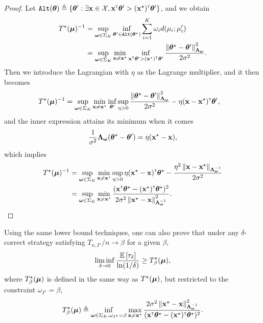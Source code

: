 \begin{proof}
Let $\texttt{Alt}({\boldsymbol \theta}) \triangleq \{{\boldsymbol \theta}':\exists {\bf x}\in\mathcal{X}, {\bf x}^\mathsf{\scriptscriptstyle T}{\boldsymbol \theta}'>({\bf x}^\star)^\mathsf{\scriptscriptstyle T}{\boldsymbol \theta}'\}$, and we obtain
\begin{align*}
    T^\star({\boldsymbol \mu})^{-1} &= \sup_{{\boldsymbol \omega}\in\Sigma_K}\inf_{{\boldsymbol \theta}'\in\texttt{Alt}({\boldsymbol \theta}^\star)}\sum_{i=1}^K \omega_i d(\mu_i;\mu_i')\\
                       &= \sup_{{\boldsymbol \omega}\in\Sigma_K}\min_{{\bf x}\neq{\bf x}^\star}\inf_{{\bf x}^\mathsf{\scriptscriptstyle T}{\boldsymbol \theta}'>({\bf x}^\star)^\mathsf{\scriptscriptstyle T}{\boldsymbol \theta}'} \frac{\left\lVert{\boldsymbol \theta}^\star-{\boldsymbol \theta}'\right\rVert_{{\boldsymbol \Lambda}_{{\boldsymbol \omega}}}^2}{2\sigma^2}.
\end{align*}
Then we introduce the Lagrangian with $\eta$ as the Lagrange multiplier, and it then becomes
\begin{align*}
    T^\star({\boldsymbol \mu})^{-1} &= \sup_{{\boldsymbol \omega}\in\Sigma_K}\min_{{\bf x}\neq{\bf x}^\star}\inf_{{\boldsymbol \theta}'}\sup_{\eta>0} \frac{\left\lVert{\boldsymbol \theta}^\star-{\boldsymbol \theta}'\right\rVert_{{\boldsymbol \Lambda}_{{\boldsymbol \omega}}}^2}{2\sigma^2} - \eta({\bf x}-{\bf x}^\star)^\mathsf{\scriptscriptstyle T}{\boldsymbol \theta}',
\end{align*}
and the inner expression attains its minimum when it comes
\[
    \frac{1}{\sigma^2}{\boldsymbol \Lambda}_{{\boldsymbol \omega}}({\boldsymbol \theta}^\star-{\boldsymbol \theta}') = \eta({\bf x}^\star-{\bf x}),
\]
which implies
\begin{align*}
    T^\star({\boldsymbol \mu})^{-1} &=
    \sup_{{\boldsymbol \omega}\in\Sigma_K}\min_{{\bf x}\neq{\bf x}^\star}\sup_{\eta>0} \eta({\bf x}^\star-{\bf x})^\mathsf{\scriptscriptstyle T}{\boldsymbol \theta}^\star - \frac{\eta^2\left\lVert{\bf x}-{\bf x}^\star\right\rVert_{{\boldsymbol \Lambda}_{{\boldsymbol \omega}}^{-1}}}{2\sigma^2}\\
    &= \sup_{{\boldsymbol \omega}\in\Sigma_K}\min_{{\bf x}\neq{\bf x}^\star}\frac{({\bf x}^\mathsf{\scriptscriptstyle T}{\boldsymbol \theta}^\star-({\bf x}^\star)^\mathsf{\scriptscriptstyle T}{\boldsymbol \theta}^\star)^2}{2\sigma^2\left\lVert{\bf x}^\star - {\bf x}\right\rVert^2_{{\boldsymbol \Lambda}_{{\boldsymbol \omega}}^{-1}}}.
\end{align*}
\end{proof}

Using the same lower bound techniques, one can also prove that under any $\delta$-correct strategy satisfying $T_{n,I^\star}/n \rightarrow \beta$ for a given $\beta$,
\[
    \liminf_{\delta \rightarrow 0}\frac{\mathbb{E}\left[\tau_\delta\right]}{\ln(1/\delta)} \geq T^\star_\beta({\boldsymbol \mu}),
\]
where $T^\star_\beta({\boldsymbol \mu})$ is defined in the same way as $T^\star({\boldsymbol \mu})$, but restricted to the constraint $\omega_{I^\star}=\beta$,
\[
    T^\star_{\beta}({\boldsymbol \mu}) \triangleq \inf_{{\boldsymbol \omega}\in\Sigma_K,\omega_{I^\star}=\beta}\max_{{\bf x}\neq {\bf x}^\star} \frac{2\sigma^2\left\lVert{\bf x}^\star - {\bf x}\right\rVert^2_{{\boldsymbol \Lambda}_{{\boldsymbol \omega}}^{-1}}}{({\bf x}^\mathsf{\scriptscriptstyle T}{\boldsymbol \theta}^\star-({\bf x}^\star)^\mathsf{\scriptscriptstyle T}{\boldsymbol \theta}^\star)^2}.
\]

